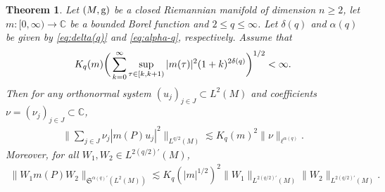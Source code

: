 \documentclass[12pt,reqno,a4paper]{amsart}
\let\coloneq\relax
\newcommand{\coloneq}{\coloneqq}
\newcommand{\C}{{\mathbb C}}
\newcommand{\g}{{\rm g}}
\newtheorem{theorem}{Theorem}[section]
\begin{document}
\begin{theorem}\label{lemma multiplier}
  Let $(M,\g)$ be a closed Riemannian manifold of dimension $n\geq 2$, let $m:[0,\infty)\to \C$ be a bounded Borel function and $2\leq q\leq\infty$. Let $\delta(q)$ and $\alpha(q)$ be given by \eqref{eq:delta(q)} and \eqref{eq:alpha-q}, respectively. Assume that
  \begin{align*}
    K_q(m)\coloneq\bigg(\sum_{k=0}^{\infty}\sup_{\tau\in [k,k+1)}|m(\tau)|^2(1+k)^{2\delta(q)}\bigg)^{1/2}<\infty .
  \end{align*}
  Then for any orthonormal system $(u_j)_{j\in J}\subset L^2(M)$ and coefficients $\nu=(\nu_j)_{j\in J}\subset\C$,
  \begin{align}\label{eq.multiplier 1}
    \bigg\|\sum_{j\in J}\nu_j |m(P)u_j|^2\bigg\|_{L^{q/2}(M)}\lesssim K_q(m)^2\|\nu\|_{\ell^{\alpha(q)}}.
  \end{align}
  Moreover, for all $W_1,W_2\in L^{2(q/2)'}(M)$,
  \begin{align}\label{eq.multiplier 2}
\|W_1m(P)W_2\|_{\mathfrak{S}^{\alpha(q)'}(L^2(M))}\lesssim K_q(|m|^{1/2})^2 \|W_1\|_{L^{2(q/2)'}(M)}\|W_2\|_{L^{2(q/2)'}(M)}.
  \end{align}
\end{theorem}
\end{document}
